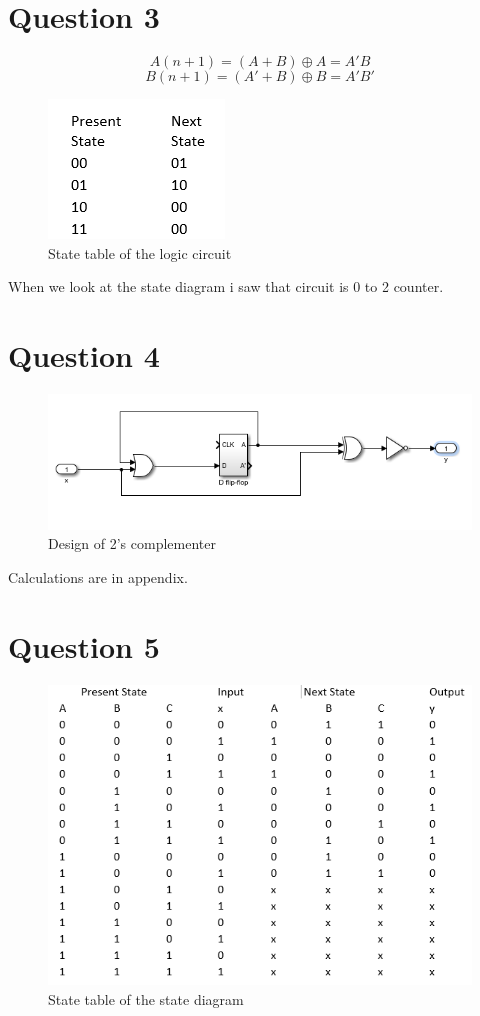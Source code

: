 \documentclass[11 pt]{article}
\begin{document}
\section*{Question 3}
\[A(n+1)=(A+B)\mathbin{\oplus} A = A'B\]
\[B(n+1)=(A'+B)\mathbin{\oplus} B = A'B'\]
\begin{figure}[H]
\centering
  \includegraphics[scale=0.7]{q3}
  \caption{State table of the logic circuit}
  \label{fig:zero}
\end{figure}
When  we look at the state diagram i saw that circuit is 0 to 2 counter. 
\section*{Question 4}
\begin{figure}[H]
\centering
  \includegraphics[scale=0.7]{q4}
  \caption{Design of 2's complementer}
  \label{fig:zero}
\end{figure}
Calculations are in appendix.
\section*{Question 5}
\begin{figure}[H]
\centering
  \includegraphics[scale=0.7]{q5}
  \caption{State table of the state diagram}
  \label{fig:zero}
\end{figure}
\end{document}
